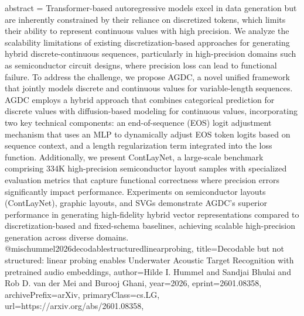 {      abstract = {Transformer-based autoregressive models excel in data generation but are inherently constrained by their reliance on discretized tokens, which limits their ability to represent continuous values with high precision. We analyze the scalability limitations of existing discretization-based approaches for generating hybrid discrete-continuous sequences, particularly in high-precision domains such as semiconductor circuit designs, where precision loss can lead to functional failure. To address the challenge, we propose AGDC, a novel unified framework that jointly models discrete and continuous values for variable-length sequences. AGDC employs a hybrid approach that combines categorical prediction for discrete values with diffusion-based modeling for continuous values, incorporating two key technical components: an end-of-sequence (EOS) logit adjustment mechanism that uses an MLP to dynamically adjust EOS token logits based on sequence context, and a length regularization term integrated into the loss function. Additionally, we present ContLayNet, a large-scale benchmark comprising 334K high-precision semiconductor layout samples with specialized evaluation metrics that capture functional correctness where precision errors significantly impact performance. Experiments on semiconductor layouts (ContLayNet), graphic layouts, and SVGs demonstrate AGDC's superior performance in generating high-fidelity hybrid vector representations compared to discretization-based and fixed-schema baselines, achieving scalable high-precision generation across diverse domains.}
}@misc{hummel2026decodablestructuredlinearprobing,
      title={Decodable but not structured: linear probing enables Underwater Acoustic Target Recognition with pretrained audio embeddings}, 
      author={Hilde I. Hummel and Sandjai Bhulai and Rob D. van der Mei and Burooj Ghani},
      year={2026},
      eprint={2601.08358},
      archivePrefix={arXiv},
      primaryClass={cs.LG},
      url={https://arxiv.org/abs/2601.08358},
}
